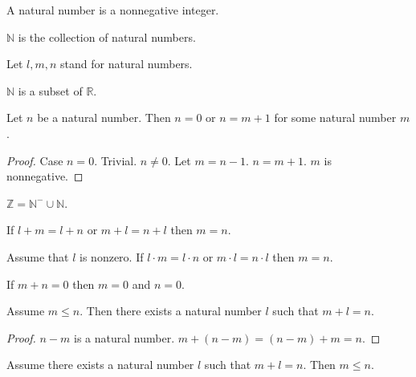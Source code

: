 \documentclass{article}
\begin{document}
\begin{forthel}

\begin{definition}
A natural number is a nonnegative integer.
\end{definition}

\begin{definition}
$\mathbb{N}$ is the collection
of natural numbers.
\end{definition}
Let $l,m,n$ stand for natural numbers.

\begin{lemma}
$\mathbb{N}$ is a subset of $\mathbb{R}$.
\end{lemma}

\begin{lemma} Let $n$ be a natural number. Then
$n = 0$ or $n = m + 1$ for some natural number $m$.
\end{lemma}
\begin{proof}
Case $n = 0$. Trivial.
$n \neq 0$. Let $m = n - 1$.
$n = m + 1$. $m$ is nonnegative.
\end{proof}


\begin{lemma}
$\mathbb{Z} = \mathbb{N}^- \cup \mathbb{N}$.
\end{lemma}



\begin{lemma}
If $l + m = l + n$ or $m + l = n + l$ then $m = n$.
\end{lemma}

\begin{lemma}
Assume that $l$ is nonzero.
If $l \cdot m = l \cdot n$ or $m \cdot l = n \cdot l$ then $m = n$.
\end{lemma}

\begin{lemma}
If $m + n = 0$ then $m = 0$ and $n = 0$.
\end{lemma}

\begin{lemma}
Assume $m \leq n$. Then
there exists a natural number $l$ such that $m + l = n$.
\end{lemma}
\begin{proof}
$n - m$ is a natural number. $m + (n-m) = (n - m) + m = n$.
\end{proof}

\begin{lemma}
Assume there exists a natural number $l$ such 
that $m + l = n$. Then $m \leq n$.
\end{lemma}


\end{forthel}
\end{document}
